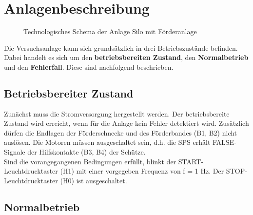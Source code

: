 \section{Anlagenbeschreibung}

\begin{figure}[H]
   \centering
   \caption[Technologieschema]{Technologisches Schema der Anlage \glqq Silo mit Förderanlage\grqq{}}
   \label{fig:Bild1}
\end{figure}

Die Versuchsanlage kann sich grundsätzlich in drei Betriebszustände befinden. Dabei handelt es sich um den \textbf{betriebsbereiten Zustand}, den \textbf{Normalbetrieb} und den \textbf{Fehlerfall}. Diese sind nachfolgend beschrieben.

\subsection{Betriebsbereiter Zustand}

Zunächst muss die Stromversorgung hergestellt werden. Der betriebsbereite Zustand wird erreicht, wenn für die Anlage kein Fehler detektiert wird. Zusätzlich dürfen die Endlagen der Förderschnecke und des Förderbandes (B1, B2) nicht auslösen. Die Motoren müssen ausgeschaltet sein, d.h. die SPS erhält FALSE-Signale der Hilfskontakte (B3, B4) der Schütze.\\
Sind die vorangegangenen Bedingungen erfüllt, blinkt der START-Leuchtdrucktaster (H1) mit einer vorgegeben Frequenz von f = 1 Hz. Der STOP-Leuchtdrucktaster (H0) ist ausgeschaltet.

\subsection{Normalbetrieb}

